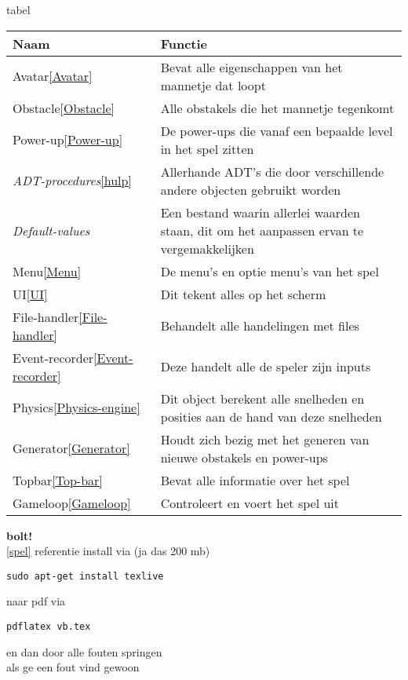 \documentclass{article}
\begin{document}
tabel\\
\begin{tabular}{| p{3cm} | p{9cm} |}
\hline
{\bf Naam} & {\bf Functie} \\ \hline
Avatar\ref{Avatar} & Bevat alle eigenschappen van het mannetje dat loopt \\ \hline
Obstacle\ref{Obstacle} & Alle obstakels die het mannetje tegenkomt \\ \hline
Power-up\ref{Power-up} & De power-ups die vanaf een bepaalde level in het spel zitten \\ \hline
\textit{ADT-procedures}\ref{hulp} & Allerhande ADT's die door verschillende andere objecten gebruikt worden \\ \hline
\textit{Default-values} & Een bestand waarin allerlei waarden staan, dit om het aanpassen ervan te vergemakkelijken \\ \hline
Menu\ref{Menu} & De menu's en optie menu's van het spel \\ \hline
UI\ref{UI} & Dit tekent alles op het scherm \\ \hline
File-handler\ref{File-handler} & Behandelt alle handelingen met files \\ \hline
Event-recorder\ref{Event-recorder} & Deze handelt alle de speler zijn inputs\\ \hline
Physics\ref{Physics-engine} & Dit object berekent alle snelheden en posities aan de hand van deze snelheden \\ \hline
Generator\ref{Generator} & Houdt zich bezig met het generen van nieuwe obstakels en power-ups \\ \hline
Topbar\ref{Top-bar} & Bevat alle informatie over het spel \\ \hline
Gameloop\ref{Gameloop} & Controleert en voert het spel uit \\ \hline
\end{tabular}

\textbf{bolt!}\\
\ref{spel} referentie
install via (ja das 200 mb)\\
\begin{lstlisting}
sudo apt-get install texlive
\end{lstlisting}
naar pdf via
\\
\begin{lstlisting}
pdflatex vb.tex
\end{lstlisting}
en dan door alle fouten springen\\
als ge een fout vind gewoon 
\end{document}
